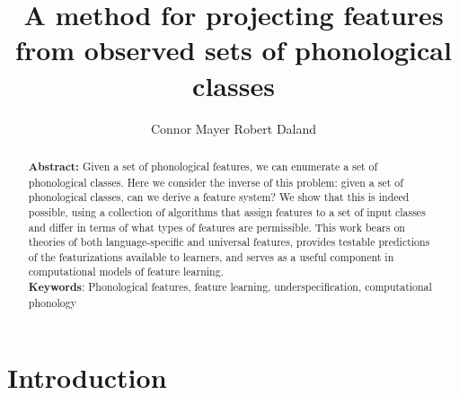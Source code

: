 \documentclass[12pt, oneside]{article}   	%
\title{A method for projecting features from observed sets of phonological classes}
\author{
  Connor Mayer \hspace{20pt} Robert Daland
}
\date{\vspace{-5ex}}							%
\begin{document}
\RaggedRight
\maketitle

\begin{abstract}
\noindent \textbf{Abstract:} Given a set of phonological features, we can enumerate a set of phonological classes. Here we consider the inverse of this problem: given a set of phonological classes, can we derive a feature system? We show that this is indeed possible, using a collection of algorithms that assign features to a set of input classes and differ in terms of what types of features are permissible. This work bears on theories of both language-specific and universal features, provides testable predictions of the featurizations available to learners, and serves as a useful component in computational models of feature learning.\\
\noindent \textbf{Keywords}: Phonological features, feature learning, underspecification, computational phonology
\end{abstract}


\section{Introduction}
\end{document}
